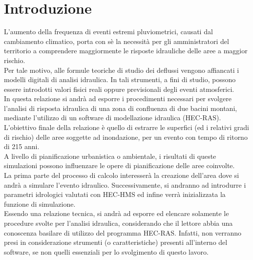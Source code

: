 \section{Introduzione}
L'aumento della frequenza di eventi estremi pluviometrici, causati dal cambiamento climatico, porta con sè la necessità per gli amministratori del territorio a comprendere maggiormente le risposte idrauliche delle aree a maggior rischio.\\
Per tale motivo, alle formule teoriche di studio dei deflussi vengono affiancati i modelli digitali di analisi idraulica. In tali strumenti, a fini di studio, possono essere introdotti valori fisici reali oppure previsionali degli eventi atmosferici.\\ 
In questa relazione si andrà ad esporre i procedimenti necessari per svolgere l'analisi di risposta idraulica di una zona di confluenza di due bacini montani, mediante l'utilizzo di un software di modellazione idraulica (HEC-RAS). L'obiettivo finale della relazione è quello di estrarre le superfici (ed i relativi gradi di rischio) delle aree soggette ad inondazione, per un evento con tempo di ritorno di 215 anni.\\
A livello di pianificazione urbanistica o ambientale, i risultati di queste simulazioni possono influenzare le opere di pianificazione delle aree coinvolte.\\
La prima parte del processo di calcolo interesserà la creazione dell'area dove si andrà a simulare l'evento idraulico. Successivamente, si andranno ad introdurre i parametri idrologici valutati con HEC-HMS ed infine verrà inizializzata la funzione di simulazione.\\
Essendo una relazione tecnica, si andrà ad esporre ed elencare solamente le procedure svolte per l'analisi idraulica, considerando che il lettore abbia una conoscenza basilare di utilizzo del programma HEC-RAS. Infatti, non verranno presi in considerazione strumenti (o caratteristiche) presenti all'interno del software, se non quelli essenziali per lo svolgimento di questo lavoro.